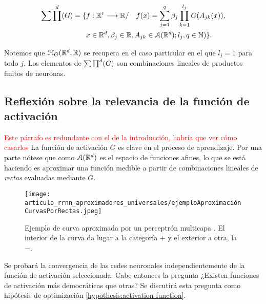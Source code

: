 \begin{definicion} \label{def:articulo_abstracción_rrnn}
    
    \begin{equation} 
        \begin{split}
        \sum \prod^d(G) = \{ 
        &f: \mathbb{R}^r \longrightarrow \mathbb{R} / \quad
        f(x) = \sum_{j = 1} ^q  \beta_j \prod_{k=1}^{l_j}
        G(A_{jk}(x)), \\
        &x  \in \mathbb{R}^d, \beta_j \in \mathbb{R}, A_{jk}\in \mathcal{A}(\mathbb{R}^d); l_j,q \in \mathbb{N}
        )
        \}.
    \end{split}
    \end{equation}  

 
    Notemos que $\mathcal{H}_G(\mathbb{R}^d,\mathbb{R})$ se recupera en el caso particular en el que $l_j = 1$ para todo $j$.
    Los elementos de $\sum \prod^d (G)$ son combinaciones lineales de productos finitos de neuronas. 

\end{definicion}


\subsection{ Reflexión sobre la relevancia de la función de activación}  

\textcolor{red}{Este párrafo es redundante con el de la introducción, habría que ver cómo casarlos}
La función de activación $G$ es clave en el proceso de aprendizaje.
Por una parte nótese que como $\mathcal{A}(\mathbb{R}^d)$ es el espacio de funciones afines, lo que se está haciendo es 
aproximar una función medible a partir de combinaciones lineales de \textit{rectas} evaluadas mediante $G$. 
 
\begin{figure}[h!]
    \texttt{[image: articulo\_rrnn\_aproximadores\_universales/ejemploAproximaciónCurvasPorRectas.jpeg]}
    \caption{Ejemplo de curva aproximada por un perceptrón multicapa \cite{alma991008058419704990}. El interior de la curva da lugar a la categoría $+$ y el exterior a otra, la $-$.}
    \label{img:def_esenciales_ejemplo_curva_aproximada_percentrón_multicapa}
\end{figure}

Se probará la convergencia de las redes neuronales independientemente de la función de activación seleccionada. Cabe entonces la pregunta
¿Existen funciones de activación más democráticas que otras? 
Se discutirá esta pregunta como hipótesis de optimización \ref{hypothesis:activation-function}.

